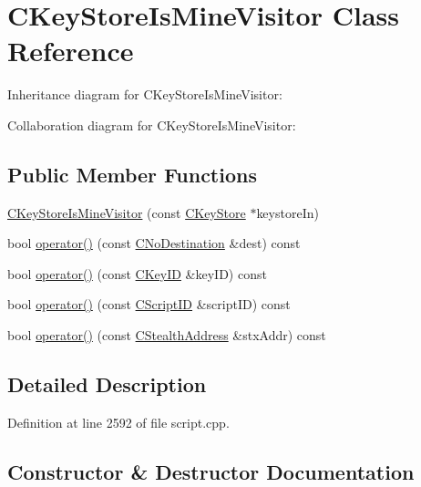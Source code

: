 \hypertarget{class_c_key_store_is_mine_visitor}{}\section{C\+Key\+Store\+Is\+Mine\+Visitor Class Reference}
\label{class_c_key_store_is_mine_visitor}


Inheritance diagram for C\+Key\+Store\+Is\+Mine\+Visitor\+:


Collaboration diagram for C\+Key\+Store\+Is\+Mine\+Visitor\+:
\subsection*{Public Member Functions}
\begin{DoxyCompactItemize}
\item 
\hyperlink{class_c_key_store_is_mine_visitor_a477146504e2fe72cdae5b135e390583b}{C\+Key\+Store\+Is\+Mine\+Visitor} (const \hyperlink{class_c_key_store}{C\+Key\+Store} $\ast$keystore\+In)
\item 
bool \hyperlink{class_c_key_store_is_mine_visitor_a9fde54444cfd5d2025afc37957632b8a}{operator()} (const \hyperlink{class_c_no_destination}{C\+No\+Destination} \&dest) const 
\item 
bool \hyperlink{class_c_key_store_is_mine_visitor_a0169d971159dd2adf4cc14079c62ad7b}{operator()} (const \hyperlink{class_c_key_i_d}{C\+Key\+I\+D} \&key\+I\+D) const 
\item 
bool \hyperlink{class_c_key_store_is_mine_visitor_a8efa88d2ac5eee13110c0d67546017fa}{operator()} (const \hyperlink{class_c_script_i_d}{C\+Script\+I\+D} \&script\+I\+D) const 
\item 
bool \hyperlink{class_c_key_store_is_mine_visitor_a77417bb4fee971dad7f1f20a778f3858}{operator()} (const \hyperlink{class_c_stealth_address}{C\+Stealth\+Address} \&stx\+Addr) const 
\end{DoxyCompactItemize}


\subsection{Detailed Description}


Definition at line 2592 of file script.\+cpp.



\subsection{Constructor \& Destructor Documentation}
\hypertarget{class_c_key_store_is_mine_visitor_a477146504e2fe72cdae5b135e390583b}{}
